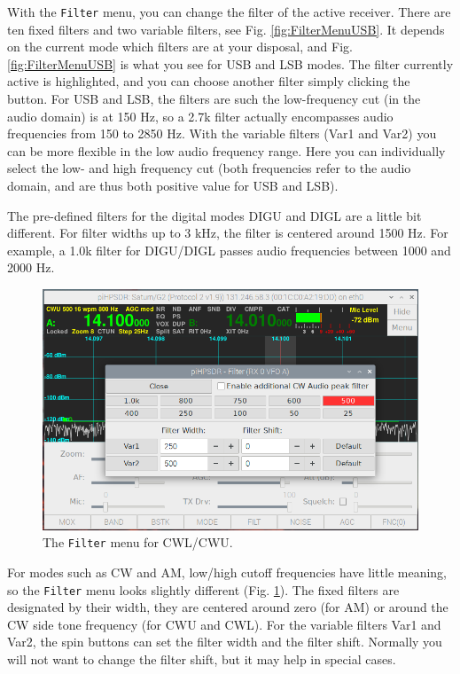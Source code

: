 \documentclass[12pt]{book}
\def\bltt#1{\texttt{\color{blue}#1}}
\begin{document}
With the \bltt{Filter} menu, you can change the filter of the active receiver. There
are ten fixed filters and two variable filters, see Fig. \ref{fig:FilterMenuUSB}. It
depends on the current mode which filters are at your disposal, and Fig. \ref{fig:FilterMenuUSB}
is what you see for USB and LSB modes. The filter currently active is highlighted, and
you can choose another filter simply clicking the button. For USB and LSB, the filters
are such the low-frequency cut (in the audio domain) is at 150 Hz, so a 2.7k filter
actually encompasses audio frequencies from 150 to 2850 Hz. With the variable filters
(Var1 and Var2) you can be more flexible in the low audio frequency range. Here you
can individually select the low- and high frequency cut (both frequencies refer to
the audio domain, and are thus both positive value for USB and LSB).

The pre-defined filters for the digital modes DIGU and DIGL are a little bit different.
For filter widths up to 3 kHz, the filter is centered around 1500 Hz. For example,
a 1.0k filter for DIGU/DIGL passes audio frequencies between 1000 and 2000 Hz.

\begin{figure}[ht]
\center
\includegraphics[width=12cm]{FilterMenuCW.png}
\caption{The \bltt{Filter} menu for CWL/CWU.}
\label{fig:FilterMenuCW}
\end{figure}

For modes such as CW and AM, low/high cutoff frequencies have little meaning, so the
\bltt{Filter} menu looks slightly different (Fig. \ref{fig:FilterMenuCW}). The fixed
filters are designated by their width, they are centered around zero (for AM) or around
the CW side tone frequency (for CWU and CWL). For the variable filters Var1 and Var2,
the spin buttons can set the filter width and the filter shift. Normally you will not
want to change the filter shift, but it may help in special cases.
\end{document}
